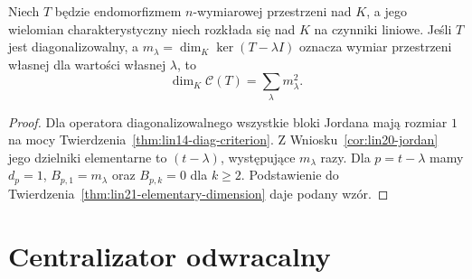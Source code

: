 \begin{wniosek}
\label{cor:lin21-diagonalizable}
Niech \(T\) będzie endomorfizmem
\(n\)-wymiarowej przestrzeni nad \(K\),
a jego wielomian charakterystyczny
niech rozkłada się nad \(K\)
na czynniki liniowe.
Jeśli \(T\) jest diagonalizowalny,
a \(m_\lambda=\dim_K\ker(T-\lambda I)\)
oznacza wymiar przestrzeni własnej
dla wartości własnej \(\lambda\),
to
\[
 \dim_K\mathcal C(T)=\sum_\lambda m_\lambda^2.
\]
\end{wniosek}
\begin{proof}
Dla operatora diagonalizowalnego
wszystkie bloki Jordana mają rozmiar \(1\)
na mocy
Twierdzenia~\ref{thm:lin14-diag-criterion}.
Z Wniosku~\ref{cor:lin20-jordan}
jego dzielniki elementarne to
\((t-\lambda)\), występujące
\(m_\lambda\) razy.
Dla \(p=t-\lambda\)
mamy \(d_p=1\),
\(B_{p,1}=m_\lambda\)
oraz \(B_{p,k}=0\) dla \(k\ge2\).
Podstawienie do
Twierdzenia~\ref{thm:lin21-elementary-dimension}
daje podany wzór.
\end{proof}

\section{Centralizator odwracalny}
\label{sec:lin21-units}

